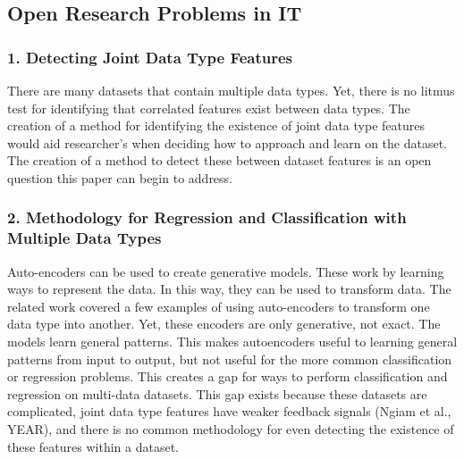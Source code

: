 \subsection{Open Research Problems in IT}

\subsubsection{1. Detecting Joint Data Type Features}
There are many datasets that contain multiple data types.  Yet, there is no litmus test for identifying that correlated features exist between data types.  The creation of a method for identifying the existence of joint data type features would aid researcher's when deciding how to approach and learn on the dataset.  The creation of a method to detect these between dataset features is an open question this paper can begin to address.

\subsubsection{2. Methodology for Regression and Classification with Multiple Data Types}
Auto-encoders can be used to create generative models. These work by learning ways to represent the data.  In this way, they can be used to transform data.  The related work covered a few examples of using auto-encoders to transform one data type into another.  Yet, these encoders are only generative, not exact.  The models learn general patterns.  This makes autoencoders useful to learning general patterns from input to output, but not useful for the more common classification or regression problems.  This creates a gap for ways to perform classification and regression on multi-data datasets.  This gap exists because these datasets are complicated, joint data type features have weaker feedback signals (Ngiam et al., YEAR), and there is no common methodology for even detecting the existence of these features within a dataset.  


